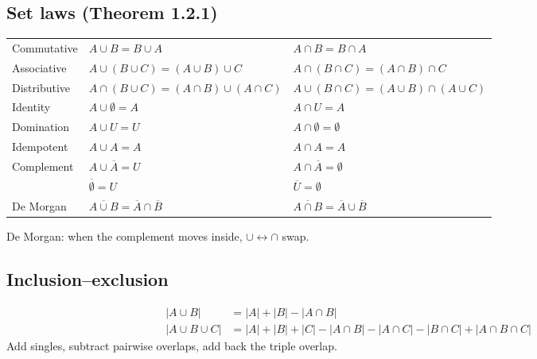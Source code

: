 \documentclass{fkt-notes}
\theoremstyle{definition}
\begin{document}
\subsection{Set laws (Theorem 1.2.1)}
%
\begin{rulepar}
  \begin{center}
    \renewcommand{\arraystretch}{1.15}
    \begin{tabular}{@{}lll@{}}
      \toprule
      Commutative  & $A\cup B=B\cup A$                                 & $A\cap B=B\cap A$                                 \\
      Associative  & $A\cup(B\cup C)=(A\cup B)\cup C$                  & $A\cap(B\cap C)=(A\cap B)\cap C$                  \\
      Distributive & $A\cap(B\cup C)=(A\cap B)\cup(A\cap C)$           & $A\cup(B\cap C)=(A\cup B)\cap(A\cup C)$           \\
      Identity     & $A\cup\emptyset=A$                                & $A\cap U=A$                                       \\
      Domination   & $A\cup U=U$                                       & $A\cap\emptyset=\emptyset$                        \\
      Idempotent   & $A\cup A=A$                                       & $A\cap A=A$                                       \\
      Complement   & $A\cup\overline{A}=U$                             & $A\cap\overline{A}=\emptyset$                     \\
                   & $\overline{\emptyset}=U$                          & $\overline{U}=\emptyset$                          \\
      De Morgan    & $\overline{A\cup B}=\overline{A}\cap\overline{B}$ & $\overline{A\cap B}=\overline{A}\cup\overline{B}$ \\
      \bottomrule
    \end{tabular}
  \end{center}
  De Morgan: when the complement moves inside, $\cup\leftrightarrow\cap$
  swap.
\end{rulepar}

\subsection{Inclusion--exclusion}\label{qg:incl}
%
\begin{rulebox}
  \vspace{-0.8em}
  \begin{align*}
    |A\cup B|       & = |A|+|B|-|A\cap B|                                             \\
    |A\cup B\cup C| & = |A|+|B|+|C| - |A\cap B|-|A\cap C|-|B\cap C| + |A\cap B\cap C|
  \end{align*}
  Add singles, subtract pairwise overlaps, add back the triple overlap.
\end{rulebox}
\end{document}

